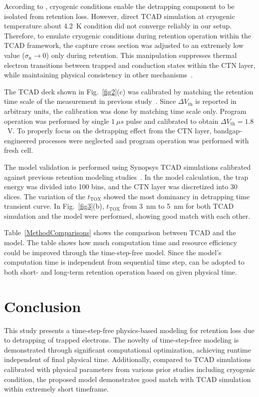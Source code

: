 \documentclass[journal,twoside,web]{ieeecolor}
\begin{document}
According to \cite{Refaldi.IRPS2025}, cryogenic conditions enable the detrapping component to be isolated from retention loss.
However, direct TCAD simulation at cryogenic temperature about 4.2~K condition did not converge reliably in our setup.
Therefore, to emulate cryogenic conditions during retention operation within the TCAD framework, the capture cross section was adjusted to an extremely low value ($\sigma_\mathrm{n} \rightarrow 0$) only during retention. 
This manipulation suppresses thermal electron transitions between trapped and conduction states within the CTN layer, while maintaining physical consistency in other mechanisms~\cite{TCADmanual.2022}.

The TCAD deck shown in Fig.~\ref{fig2}(c) was calibrated by matching the retention time scale of the measurement in previous study~\cite{Refaldi.IRPS2025}.
Since $\Delta V_\text{th}$ is reported in arbitrary units, the calibration was done by matching time scale only.
Program operation was performed by single $1~\mu s$ pulse and calibrated to obtain $\Delta V_\text{th} = 1.8$~V.
To properly focus on the detrapping effect from the CTN layer, bandgap-engineered processes were neglected and program operation was performed with fresh cell.

The model validation is performed using Synopsys TCAD simulations calibrated against previous retention modeling studies~\cite{Han.TED2026, Jin.TED2025}. 
In the model calculation, the trap energy was divided into 100 bins, and the CTN layer was discretized into 30 slices.
The variation of the $t_\text{TOX}$ showed the most dominancy in detrapping time transient curve.
In Fig.~\ref{fig3}(b), $t_\text{TOX}$ from 3~nm to 5~nm for both TCAD simulation and the model were performed, showing good match with each other.

Table~\ref{MethodComparisons} shows the comparison between TCAD and the model.
The table shows how much computation time and resource efficiency could be improved through the time-step-free model.
Since the model's computation time is independent from sequential time step, can be adopted to both short- and long-term retention operation based on given physical time.

\section{Conclusion}
This study presents a time-step-free physics-based modeling for retention loss due to detrapping of trapped electrons. 
The novelty of time-step-free modeling is demonstrated through significant computational optimization, achieving runtime independent of final physical time.
Additionally, compared to TCAD simulations calibrated with physical parameters from various prior studies including cryogenic condition, the proposed model demonstrates good match with TCAD simulation within extremely short timeframe. 
\end{document}
